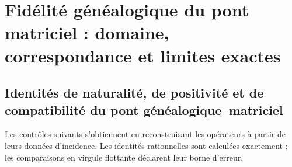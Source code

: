 \chapter{Fidélité généalogique du pont matriciel : domaine, correspondance et limites exactes}
\label{gmc:app:certificado}

\section{Identités de naturalité, de positivité et de compatibilité du pont généalogique–matriciel}

Les contrôles suivants s'obtiennent en reconstruisant les opérateurs à partir de leurs
données d'incidence. Les identités rationnelles sont calculées exactement ; les
comparaisons en virgule flottante déclarent leur borne d'erreur.

